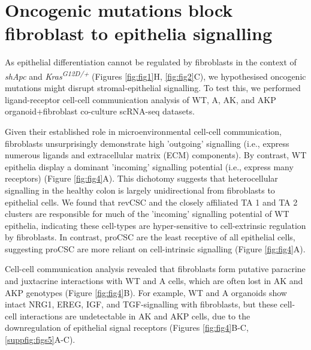 \section{Oncogenic mutations block fibroblast to epithelia signalling}

As epithelial differentiation cannot be regulated by fibroblasts in the context of \textit{shApc} and \textit{Kras\textsuperscript{G12D/+}} (Figures \ref{fig:fig1}H, \ref{fig:fig2}C), we hypothesised oncogenic mutations might disrupt stromal-epithelial signalling. To test this, we performed ligand-receptor cell-cell communication analysis \cite{jin_inference_2021} of WT, A, AK, and AKP organoid+fibroblast co-culture scRNA-seq datasets. 

Given their established role in microenvironmental cell-cell communication, fibroblasts unsurprisingly demonstrate high 'outgoing' signalling (i.e., express numerous ligands and extracellular matrix (ECM) components). By contrast, WT epithelia display a dominant 'incoming' signalling potential (i.e., express many receptors) (Figure \ref{fig:fig4}A). This dichotomy suggests that heterocellular signalling in the healthy colon is largely unidirectional from fibroblasts to epithelial cells. We found that revCSC and the closely affiliated TA 1 and TA 2 clusters are responsible for much of the 'incoming' signalling potential of WT epithelia, indicating these cell-types are hyper-sensitive to cell-extrinsic regulation by fibroblasts. In contrast, proCSC are the least receptive of all epithelial cells, suggesting proCSC are more reliant on cell-intrinsic signalling (Figure \ref{fig:fig4}A). 

Cell-cell communication analysis revealed that fibroblasts form putative paracrine and juxtacrine interactions with WT and A cells, which are often lost in AK and AKP genotypes (Figure \ref{fig:fig4}B). For example, WT and A organoids show intact NRG1, EREG, IGF, and TGF-\textbeta\hspace{0.1cm}signalling with fibroblasts, but these cell-cell interactions are undetectable in AK and AKP cells, due to the downregulation of epithelial signal receptors (Figures \ref{fig:fig4}B-C, \ref{suppfig:figs5}A-C).




